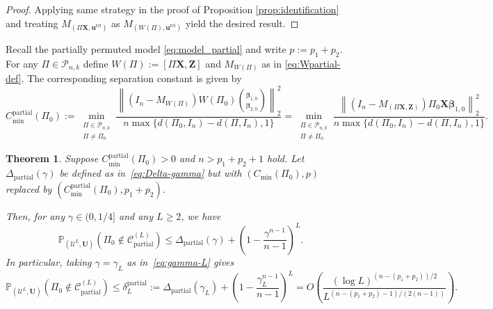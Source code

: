 \documentclass[11pt, reqno]{amsart}
\newcommand{\bP}{\mathbb{P}}
\renewcommand{\le}{\leqslant}
\renewcommand{\ge}{\geqslant}
\newcommand{\mP}{\mathcal{P}}
\newcommand{\1}{\mbox{1}\hspace{-0.25em}\mbox{l}}
\newcommand{\rel}{\mathrm{rel}}
\theoremstyle{definition}\newtheorem{problem}{Problem}[section]
\theoremstyle{definition}\newtheorem{definition}[problem]{Definition}
\theoremstyle{remark}\newtheorem{assumption}{Assumption}
\theoremstyle{remark}\newtheorem{remark}[problem]{Remark}
\theoremstyle{definition}\newtheorem{example}[problem]{Example}
\theoremstyle{plain}\newtheorem{theorem}[problem]{Theorem}
\theoremstyle{plain}\newtheorem{question}[problem]{Question}
\theoremstyle{plain}\newtheorem{lemma}[problem]{Lemma}
\theoremstyle{plain}\newtheorem{proposition}[problem]{Proposition}
\theoremstyle{plain}\newtheorem{corollary}[problem]{Corollary}
\theoremstyle{plain}\newtheorem{conjecture}[problem]{Conjecture}
\begin{document}
\begin{proof}
Applying same strategy in the proof of Proposition \ref{prop:identification} and treating $M_{(\Pi \bm{X}, \bm{u}^{\rel})}$ as $M_{(W(\Pi), \bm{u}^{\rel})}$ yield the desired result.
\end{proof}

Recall the partially permuted model \eqref{eq:model_partial} and write $p:=p_1+p_2$.
For any $\Pi\in\mP_{n,k}$ define $W(\Pi):=[\Pi\bm X,\bm Z]$ and $M_{W(\Pi)}$ as in
\eqref{eq:Wpartial-def}.  The corresponding separation constant is given by
\begin{equation}\label{eq:c-min-partial}
C_{\min}^{\mathrm{partial}}(\Pi_0)
:=\min_{\substack{\Pi\in\mP_{n,k}\\ \Pi\neq \Pi_0}}
\frac{\left\| (I_n-M_{W(\Pi)})W(\Pi_0)\binom{\bm\beta_{1,0}}{\bm\beta_{2,0}}\right\|_2^2}
     {n\max\{d(\Pi_0,I_n)-d(\Pi,I_n),1\}}
=\min_{\substack{\Pi\in\mP_{n,k}\\ \Pi\neq \Pi_0}}
\frac{\left\| (I_n-M_{(\Pi\bm X,\bm Z)})\Pi_0\bm X\bm\beta_{1,0}\right\|_2^2}
     {n\max\{d(\Pi_0,I_n)-d(\Pi,I_n),1\}}.
\end{equation}


\begin{theorem}\label{thm:recovery partial}
Suppose $C_{\min}^{\mathrm{partial}}(\Pi_0) > 0$ and $n > p_1 + p_2 + 1$ hold.
Let $\Delta_{\mathrm{partial}}(\gamma)$ be defined as in~\eqref{eq:Delta-gamma} but with
$(C_{\min}(\Pi_0),p)$ replaced by $(C_{\min}^{\mathrm{partial}}(\Pi_0),p_1+p_2)$.

Then, for any $\gamma \in (0, 1/4]$ and any $L \ge 2$, we have
\begin{equation}\label{eq:recovery-finite-L-partial}
    \bP_{(\mathcal{U}^L, \bm{U})}\left( \Pi_0 \notin \mathcal{C}_{\mathrm{partial}}^{(L)} \right)
    \le
    \Delta_{\mathrm{partial}}(\gamma)
    + \left(1 - \frac{\gamma^{n-1}}{n-1}\right)^L.
\end{equation}
In particular, taking $\gamma = \gamma_L$ as in~\eqref{eq:gamma-L} gives
\begin{equation}\label{eq:recovery-finite-L-partial-gammaL}
    \bP_{(\mathcal{U}^L, \bm{U})}\left( \Pi_0 \notin \mathcal{C}_{\mathrm{partial}}^{(L)} \right)
    \le
    \delta_L^{\mathrm{partial}}
    :=
    \Delta_{\mathrm{partial}}(\gamma_L)
    + \left(1 - \frac{\gamma_L^{n-1}}{n-1}\right)^L
    = O\left( \frac{(\log L)^{(n-(p_1+p_2))/2}}{L^{(n-(p_1+p_2)-1)/(2(n-1))}} \right).
\end{equation}
\end{theorem}
\end{document}
